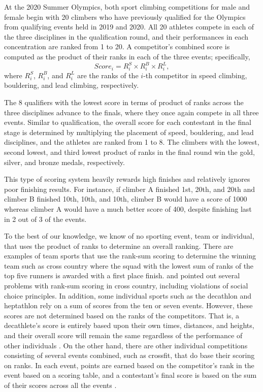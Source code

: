\documentclass[letterpaper, inpress]{jds} %
\begin{document}
At the 2020 Summer Olympics, both sport climbing competitions for male and female begin with 20 climbers who have previously qualified for the Olympics from qualifying events held in 2019 and 2020. All 20 athletes compete in each of the three disciplines in the qualification round, and their performances in each concentration are ranked from 1 to 20. A competitor's combined score is computed as the product of their ranks in each of the three events; specifically,
\begin{equation} \label{eq:1}
Score_i = R^S_i\times R^B_i\times R^L_i,
\end{equation} 
where $R^S_i$, $R^B_i$, and $R^L_i$ are the ranks of the $i$-th competitor in speed climbing, bouldering, and lead climbing, respectively.  

The 8 qualifiers with the lowest score in terms of product of ranks across the three disciplines advance to the finals, where they once again compete in all three events. Similar to qualification, the overall score for each contestant in the final stage is determined by multiplying the placement of speed, bouldering, and lead disciplines, and the athletes are ranked from 1 to 8. The climbers with the lowest, second lowest, and third lowest product of ranks in the final round win the gold, silver, and bronze medals, respectively.

This type of scoring system heavily rewards high finishes and relatively ignores poor finishing results. For instance, if climber A finished 1st, 20th, and 20th and climber B finished 10th, 10th, and 10th, climber B would have a score of 1000 whereas climber A would have a much better score of 400, despite finishing last in 2 out of 3 of the events.  

To the best of our knowledge, we know of no sporting event, team or individual, that uses the product of ranks to determine an overall ranking. There are examples of team sports that use the rank-sum scoring to determine the winning team such as cross country where the squad with the lowest sum of ranks of the top five runners is awarded with a first place finish. \cite{hammond2007} and \cite{boudreau2018} pointed out several problems with rank-sum scoring in cross country, including violations of social choice principles. In addition, some individual sports such as the decathlon and heptathlon rely on a sum of scores from the ten or seven events. However, these scores are not determined based on the ranks of the competitors. That is, a decathlete's score is entirely based upon their own times, distances, and heights, and their overall score will remain the same regardless of the performance of other individuals \citep{westera2006}. On the other hand, there are other individual competitions consisting of several events combined, such as crossfit, that do base their scoring on ranks. In each event, points are earned based on the competitor's rank in the event based on a scoring table, and a contestant's final score is based on the sum of their scores across all the events \citep{crossfit2021}. 
\end{document}
